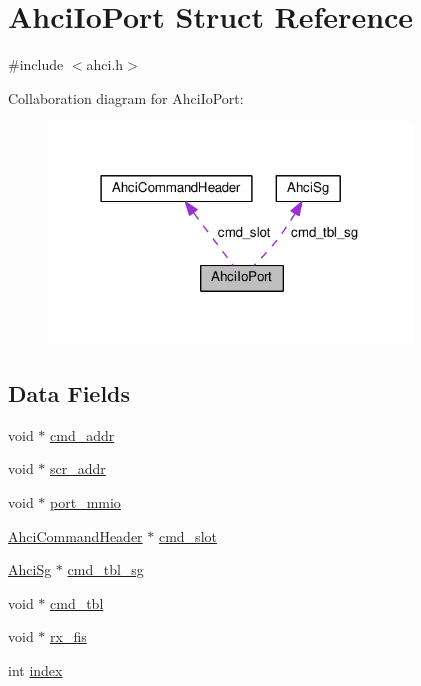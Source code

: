 \hypertarget{structAhciIoPort}{}\section{Ahci\+Io\+Port Struct Reference}
\label{structAhciIoPort}


{\ttfamily \#include $<$ahci.\+h$>$}



Collaboration diagram for Ahci\+Io\+Port\+:
\nopagebreak
\begin{figure}[H]
\begin{center}
\leavevmode
\includegraphics[width=274pt]{structAhciIoPort__coll__graph}
\end{center}
\end{figure}
\subsection*{Data Fields}
\begin{DoxyCompactItemize}
\item 
void $\ast$ \hyperlink{structAhciIoPort_ae62df7029d120c6efa10deebede2b1e9}{cmd\+\_\+addr}
\item 
void $\ast$ \hyperlink{structAhciIoPort_a5f15bb2db00d1bcfee213b59a0477452}{scr\+\_\+addr}
\item 
void $\ast$ \hyperlink{structAhciIoPort_a160a4ec60fb246c73a3c23a47aff0426}{port\+\_\+mmio}
\item 
\hyperlink{structAhciCommandHeader}{Ahci\+Command\+Header} $\ast$ \hyperlink{structAhciIoPort_a428f4de0af81ffd4be8a83cc763bfd27}{cmd\+\_\+slot}
\item 
\hyperlink{structAhciSg}{Ahci\+Sg} $\ast$ \hyperlink{structAhciIoPort_a71965bd481c51a76e529ec68b863acd5}{cmd\+\_\+tbl\+\_\+sg}
\item 
void $\ast$ \hyperlink{structAhciIoPort_a8768362980d0f4bee31bdce784b28c07}{cmd\+\_\+tbl}
\item 
void $\ast$ \hyperlink{structAhciIoPort_a0b1d803da9f594706b01b2edba108253}{rx\+\_\+fis}
\item 
int \hyperlink{structAhciIoPort_a011f1e42e32e23744a6395a0c9b8bb21}{index}
\end{DoxyCompactItemize}


